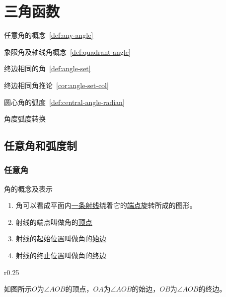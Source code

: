\chapter{三角函数}
\label{ch:三角函数}

\begin{introduction}
  \item 任意角的概念~\ref{def:any-angle}
  \item 象限角及轴线角概念~\ref{def:quadrant-angle}
  \item 终边相同的角~\ref{def:angle-set}
  \item 终边相同角推论~\ref{cor:angle-set-col}
  \item 圆心角的弧度~\ref{def:central-angle-radian}
  \item 角度弧度转换
\end{introduction}

\section{任意角和弧度制}

\subsection{任意角}

\begin{remark}{\vspace{0.3mm}角的概念及表示}
\begin{enumerate}
\item 角可以看成平面内\underline{一条射线}绕着它的\underline{端点}旋转所成的图形。
\item 射线的端点叫做角的\underline{顶点}
\item 射线的起始位置叫做角的\underline{始边}
\item 射线的终止位置叫做角的\underline{终边}
\end{enumerate}
\begin{wrapfigure}{r}{0.25\textwidth}
\begin{center}
\end{center}
\end{wrapfigure}
如图所示$O$为$\angle{AOB}$的顶点，$OA$为$\angle{AOB}$的始边，$OB$为$\angle{AOB}$的终边。
\end{remark}


